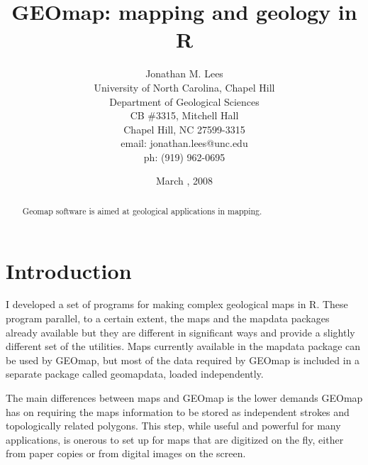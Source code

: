 \documentclass{article}
\begin{document}








\author{Jonathan M. Lees\\
University of North Carolina, Chapel Hill\\
Department of Geological Sciences\\
CB \#3315, Mitchell Hall\\
Chapel Hill, NC  27599-3315\\
email: jonathan.lees@unc.edu\\
ph: (919) 962-0695
}
\title{GEOmap: mapping and geology in R}
\date{March , 2008}

\maketitle

\begin{abstract}
Geomap software is aimed at geological applications in mapping. 

\end{abstract}

\section{Introduction}
I developed a set of programs for making complex geological maps in R.
These program parallel, to a certain extent, the maps and the mapdata 
packages already available but they are different in significant ways and 
provide a slightly different set of the utilities.
Maps currently available in the mapdata package can be used
by GEOmap, but most of the data required by 
GEOmap is included in a separate package called geomapdata,
loaded independently. 

The main differences between maps and GEOmap is the lower demands
GEOmap has on requiring the maps information to be stored as independent 
strokes and topologically related polygons.  This step, while useful
and powerful for many applications, is onerous to set up for 
maps that are digitized on the fly, either from paper 
copies or from digital images on the screen.
\end{document}
